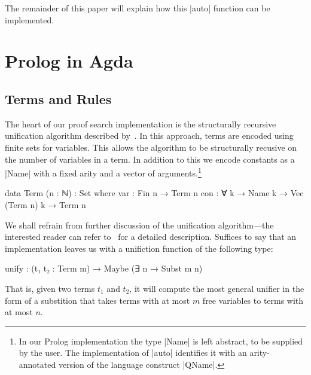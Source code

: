 \documentclass[preprint]{sigplanconf}
\begin{document}
The remainder of this paper will explain how this |auto| function can
be implemented.

\section{Prolog in Agda}
\label{sec:prolog}

\subsection{Terms and Rules}

The heart of our proof search implementation is the structurally recursive
unification algorithm described by~\citet{unification}. In this approach, terms
are encoded using finite sets for variables. This allows the algorithm to
be structurally recusive on the number of variables in a term. In addition
to this we encode constants as a |Name| with a fixed arity and a vector of
arguments.\footnote{
  In our Prolog implementation the type |Name| is left abstract, to be
  supplied by the user. The implementation of |auto| identifies it with
  an arity-annotated version of the language construct |QName|.
}


\begin{code}
  data Term (n : ℕ) : Set where
    var  : Fin n → Term n
    con  : ∀ {k} → Name k → Vec (Term n) k → Term n
\end{code}




We shall refrain from further discussion of the unification algorithm---the
interested reader can refer to~\cite{mcbride} for a detailed description.
Suffices to say that an implementation leaves us with a unifiction function
of the following type:

\begin{spec}
  unify : (t₁ t₂ : Term m) → Maybe (∃ n → Subst m n)
\end{spec}

That is, given two terms $t_1$ and $t_2$, it will compute the most general
unifier in the form of a substition that takes terms with at most $m$ free
variables to terms with at most $n$. 
\end{document}
